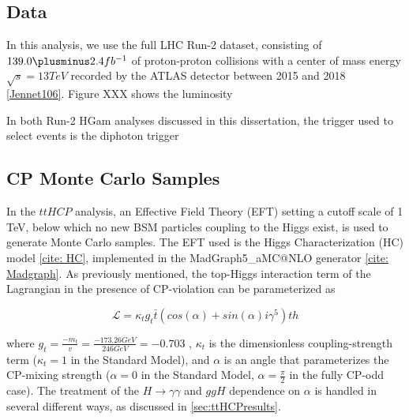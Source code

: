 \subsection{Data} \label{sec:Data}

In this analysis, we use the full LHC Run-2 dataset, consisting of $139.0 \plusminus 2.4 fb^{-1}$ of proton-proton collisions with a center of mass energy $\sqrt{s} = 13 TeV$ recorded by the ATLAS detector between 2015 and 2018 \ref{Jennet106}. Figure XXX shows the luminosity 

In both Run-2 HGam analyses discussed in this dissertation, the trigger used to select events is the diphoton trigger



\subsection{CP Monte Carlo Samples} \label{sec:ttHCPMC} 

In the $ttH CP$ analysis, an Effective Field Theory (EFT) setting a cutoff scale of 1 TeV, below which no new BSM particles coupling to the Higgs exist, is used to generate Monte Carlo samples. The EFT used is the Higgs Characterization (HC) model \ref{cite: HC}, implemented in the  MadGraph5_aMC@NLO generator \ref{cite: Madgraph}. As previously mentioned, the top-Higgs interaction term of the Lagrangian in the presence of CP-violation can be parameterized as

\begin{equation}
\mathcal{L} = \kappa_{t} g_{t} \bar{t} (cos(\alpha)+ sin(\alpha) i \gamma^{5} )th
\end{equation}

where $g_{t} = \frac{-m_{t}}{v} = \frac{-173.26 GeV}{246 GeV} = -0.703$ , $\kappa_{t}$ is the dimensionless coupling-strength term ($\kappa_{t}= 1$ in the Standard Model), and $\alpha$ is an angle that parameterizes the CP-mixing strength ($\alpha = 0$ in the Standard Model, $\alpha = \frac{\pi}{2}$ in the fully CP-odd case). The treatment of the $H \rightarrow \gamma \gamma$ and $ggH$ dependence on $\alpha$ is handled in several different ways, as discussed in \ref{sec:ttHCPresults}.

